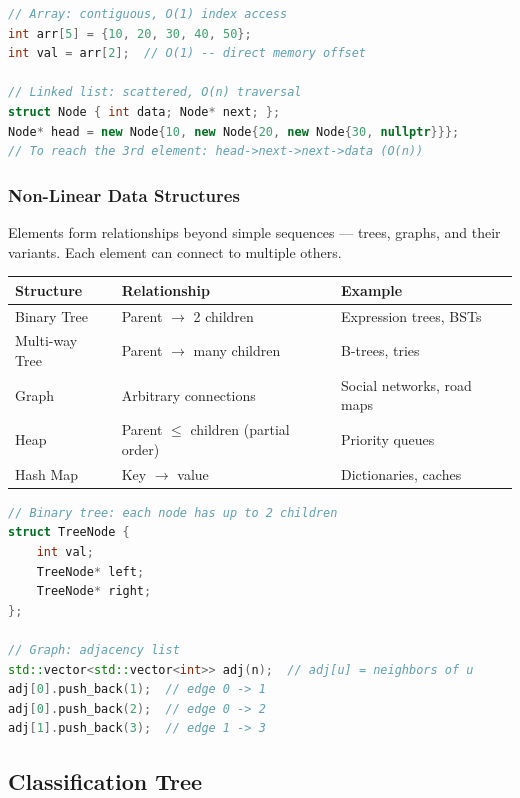 \begin{lstlisting}[language=C++]
// Array: contiguous, O(1) index access
int arr[5] = {10, 20, 30, 40, 50};
int val = arr[2];  // O(1) -- direct memory offset

// Linked list: scattered, O(n) traversal
struct Node { int data; Node* next; };
Node* head = new Node{10, new Node{20, new Node{30, nullptr}}};
// To reach the 3rd element: head->next->next->data (O(n))
\end{lstlisting}

\subsubsection{Non-Linear Data Structures}

Elements form relationships beyond simple sequences — trees, graphs, and their variants. Each element can connect to multiple others.

\begin{center}
\begin{tabular}{lll}
\toprule
Structure & Relationship & Example \\
\midrule
Binary Tree & Parent $\to$ 2 children & Expression trees, BSTs \\
Multi-way Tree & Parent $\to$ many children & B-trees, tries \\
Graph & Arbitrary connections & Social networks, road maps \\
Heap & Parent $\leq$ children (partial order) & Priority queues \\
Hash Map & Key $\to$ value & Dictionaries, caches \\
\bottomrule
\end{tabular}
\end{center}

\begin{lstlisting}[language=C++]
// Binary tree: each node has up to 2 children
struct TreeNode {
    int val;
    TreeNode* left;
    TreeNode* right;
};

// Graph: adjacency list
std::vector<std::vector<int>> adj(n);  // adj[u] = neighbors of u
adj[0].push_back(1);  // edge 0 -> 1
adj[0].push_back(2);  // edge 0 -> 2
adj[1].push_back(3);  // edge 1 -> 3
\end{lstlisting}

\subsection{Classification Tree}

